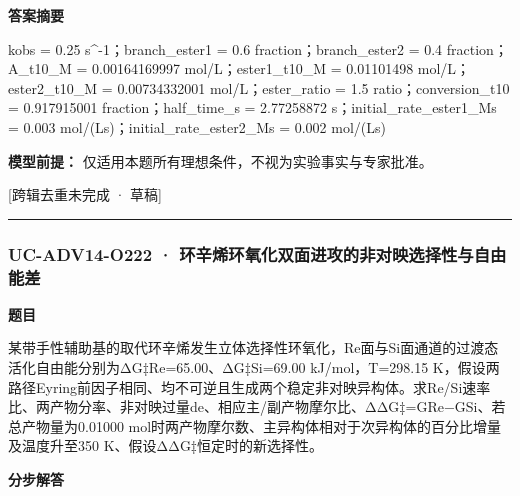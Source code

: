\documentclass[UTF8,11pt,a4paper]{ctexart}
\begin{document}
\noindent\textbf{答案摘要}\par
kobs = 0.25 s\textasciicircum{}-1；branch\_ester1 = 0.6 fraction；branch\_ester2 = 0.4 fraction；A\_t10\_M = 0.00164169997 mol/L；ester1\_t10\_M = 0.01101498 mol/L；ester2\_t10\_M = 0.00734332001 mol/L；ester\_ratio = 1.5 ratio；conversion\_t10 = 0.917915001 fraction；half\_time\_s = 2.77258872 s；initial\_rate\_ester1\_Ms = 0.003 mol/(Ls)；initial\_rate\_ester2\_Ms = 0.002 mol/(Ls)\par
\noindent\textbf{模型前提：}
仅适用本题所有理想条件，不视为实验事实与专家批准。\par
\noindent\textcolor{red!65!black}{[跨辑去重未完成 · 草稿]} \par
\medskip\hrule\medskip
{}
\subsubsection*{UC-ADV14-O222 · 环辛烯环氧化双面进攻的非对映选择性与自由能差}
\noindent\textbf{题目}\par
某带手性辅助基的取代环辛烯发生立体选择性环氧化，Re面与Si面通道的过渡态活化自由能分别为ΔG‡Re=65.00、ΔG‡Si=69.00 kJ/mol，T=298.15 K，假设两路径Eyring前因子相同、均不可逆且生成两个稳定非对映异构体。求Re/Si速率比、两产物分率、非对映过量de、相应主/副产物摩尔比、ΔΔG‡=GRe−GSi、若总产物量为0.01000 mol时两产物摩尔数、主异构体相对于次异构体的百分比增量及温度升至350 K、假设ΔΔG‡恒定时的新选择性。\par
\medskip\noindent\textbf{分步解答}
\end{document}
